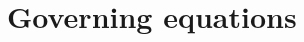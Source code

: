 \documentclass[smallextended]{svjour3}
\numberwithin{equation}{section}
\numberwithin{figure}{section}
\numberwithin{table}{section}
\newcommand\ff{\boldsymbol{f}}
\newcommand\bu{\boldsymbol{u}}
\newcommand\vdiv{{\mathop{\mathrm{div}}\nolimits}}
\newcommand\OmS{\Omega^{\mathrm{F}}}
\begin{document}
	
	

	
	\section{Governing equations}\label{sec:model}
	
%	
\end{document}
